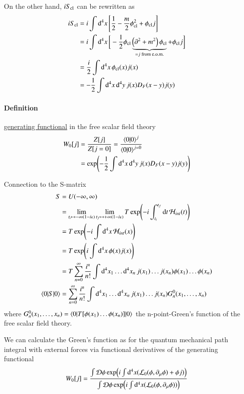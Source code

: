On the other hand, $iS_{\text{cl}}$ can be rewritten as
\begin{align*}
   iS_{\text{cl}} &= i \int \dd[4]{x} \left[ \frac{1}{2} - \frac{m}{2} \phi_{\text{cl}}^2 + \phi_{\text{cl}} j \right] \\
           &= i \int \dd[4]{x} \bigg[ -\frac{1}{2} \phi_{\text{cl}} \underbrace{\left( \partial^2 + m^2 \right)\phi_{\text{cl}}}_{=j \;\text{from e.o.m.}} + \phi_{\text{cl}} j \bigg] \\
           &= \frac{i}{2} \int \dd[4]{x} \phi_{\text{cl}}(x) j(x) \\
           &= -\frac{1}{2} \int \dd[4]{x} \dd[4]{y} j(x) D_F(x-y) j(y)
\end{align*}

\paragraph{Definition} \underline{generating functional} in the free scalar field theory
\begin{align}
   W_0[j] &= \frac{Z[j]}{Z[j=0]} = \frac{\braket{0 | 0}^j}{\braket{0 | 0}^{j=0}} \notag\\
            &= \exp(-\frac{1}{2} \int \dd[4]{x}\dd[4]{y} j(x) D_F(x-y) j(y))
\end{align}

Connection to the S-matrix
\begin{align}
   S &= U(-\infty, \infty) \notag\\
     &= \lim_{t_i \mapsto -\infty(1-i\epsilon)}\lim_{t_f \mapsto +\infty(1-i\epsilon)} T \exp(-i\int^{t_f}_{t_i} \dd{t} \mathcal{H}_{int} (t)) \notag\\
   &= T \exp(-i\int \dd[4]{x}\mathcal{H}_{int} (x)) \notag\\
   &= T \exp(i\int \dd[4]{x} \phi(x) j(x)) \notag\\
   &= T \sum_{n=0}^{\infty} \frac{i^n}{n!} \int \dd[4]{x_1} \dots \dd[4]{x_n} j(x_1) \dots j(x_n) \phi(x_1) \dots \phi(x_n) \notag\\
   \braket{0 | S | 0} &= \sum_{n=0}^{\infty} \frac{i^n}{n!} \int \dd[4]{x_1} \dots \dd[4]{x_n}  j(x_1) \dots j(x_n)G_n^0 (x_1, \dots, x_n)
\end{align}
where $G^0_n(x_1, \dots, x_n) = \braket{0 | T [\phi(x_1) \dots \phi(x_n)]| 0}$ the n-point-Green's function of the free scalar field theory.

We can calculate the Green's function as for the quantum mechanical path integral with external forces via functional derivatives of the generating functional
\begin{align}
   W_0[j] = \frac{\int \mathcal{D} \phi \exp(i\int \dd^4 x (\mathcal{L}_0(\phi, \partial_\mu \phi)+\phi j))}{\int \mathcal{D} \phi \exp(i\int \dd^4 x (\mathcal{L}_0(\phi, \partial_\mu \phi)))}
\end{align}

